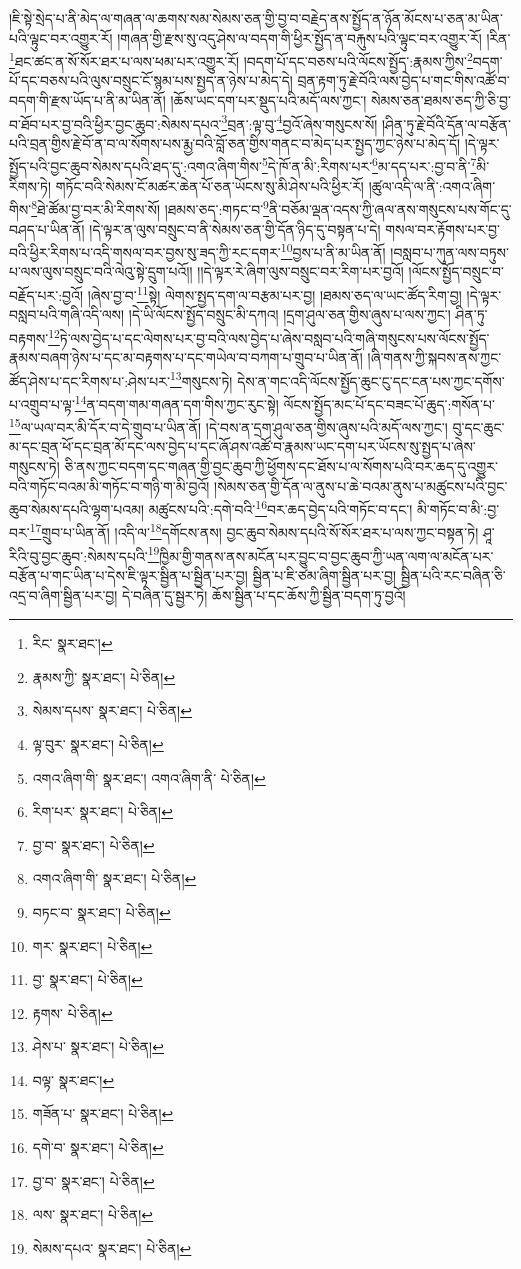 །ཇི་སྟེ་སྲེད་པ་ནི་མེད་ལ་གཞན་ལ་ཆགས་སམ་སེམས་ཅན་གྱི་བྱ་བ་བརྗེད་ནས་སྤྱོད་ན་ཉོན་མོངས་པ་ཅན་མ་ཡིན་པའི་ལྟུང་བར་འགྱུར་རོ། །གཞན་གྱི་རྫས་སུ་འདུ་ཤེས་ལ་བདག་གི་ཕྱིར་སྤྱོད་ན་བརྐུས་པའི་ལྟུང་བར་འགྱུར་རོ། །རིན་\footnote{རིང་  སྣར་ཐང་། }ཐང་ཚང་ན་སོ་སོར་ཐར་པ་ལས་ཕམ་པར་འགྱུར་རོ། །བདག་པོ་དང་བཅས་པའི་ལོངས་སྤྱོད་:རྣམས་ཀྱིས་\footnote{རྣམས་ཀྱི་  སྣར་ཐང་།  པེ་ཅིན། }བདག་པོ་དང་བཅས་པའི་ལུས་བསྲུང་ངོ་སྙམ་པས་སྤྱད་ན་ཉེས་པ་མེད་དེ། བྲན་རྟག་ཏུ་རྗེ་བོའི་ལས་བྱེད་པ་གང་གིས་འཚོ་བ་བདག་གི་རྫས་ཡོད་པ་ནི་མ་ཡིན་ནོ། །ཆོས་ཡང་དག་པར་སྡུད་པའི་མདོ་ལས་ཀྱང་། སེམས་ཅན་ཐམས་ཅད་ཀྱི་ཅི་བྱ་བ་ཐོབ་པར་བྱ་བའི་ཕྱིར་བྱང་ཆུབ་:སེམས་དཔའ་\footnote{སེམས་དཔས་  སྣར་ཐང་།  པེ་ཅིན། }བྲན་:ལྟ་བུ་\footnote{ལྟ་བུར་  སྣར་ཐང་།  པེ་ཅིན། }བྱའོ་ཞེས་གསུངས་སོ། །ཤིན་ཏུ་རྗེ་བོའི་དོན་ལ་བརྩོན་པའི་བྲན་གྱིས་རྗེ་བོ་ན་བ་ལ་སོགས་པས་རྨྱ་བའི་བློ་ཅན་གྱིས་གནང་བ་མེད་པར་སྤྱད་ཀྱང་ཉེས་པ་མེད་དོ། །དེ་ལྟར་སྤྱོད་པའི་བྱང་ཆུབ་སེམས་དཔའི་ཐད་དུ་:འགའ་ཞིག་གིས་\footnote{འགའ་ཞིག་གི་  སྣར་ཐང་། འགའ་ཞིག་ནི་  པེ་ཅིན། }དེ་ཁོ་ན་མི་:རིགས་པར་\footnote{རིག་པར་  སྣར་ཐང་།  པེ་ཅིན། }མ་དད་པར་:བྱ་བ་ནི་\footnote{བྱ་བ་  སྣར་ཐང་།  པེ་ཅིན། }མི་རིགས་ཏེ། གཏོང་བའི་སེམས་ངོ་མཚར་ཆེན་པོ་ཅན་ཡོངས་སུ་མི་ཤེས་པའི་ཕྱིར་རོ། །ཚུལ་འདི་ལ་ནི་:འགའ་ཞིག་གིས་\footnote{འགའ་ཞིག་གི་  སྣར་ཐང་།  པེ་ཅིན། }ཐེ་ཚོམ་བྱ་བར་མི་རིགས་སོ། །ཐམས་ཅད་:གཏང་བ་\footnote{བཏང་བ་  སྣར་ཐང་།  པེ་ཅིན། }ནི་བཅོམ་ལྡན་འདས་ཀྱི་ཞལ་ནས་གསུངས་པས་གོང་དུ་བཤད་པ་ཡིན་ནོ། །དེ་ལྟར་ན་ལུས་བསྲུང་བ་ནི་སེམས་ཅན་གྱི་དོན་ཉིད་དུ་བསྟན་པ་དེ། གསལ་བར་རྟོགས་པར་བྱ་བའི་ཕྱིར་རིགས་པ་འདི་གསལ་བར་བྱས་སུ་ཟད་ཀྱི་རང་དགར་\footnote{གར་  སྣར་ཐང་།  པེ་ཅིན། }བྱས་པ་ནི་མ་ཡིན་ནོ། །བསླབ་པ་ཀུན་ལས་བཏུས་པ་ལས་ལུས་བསྲུང་བའི་ལེའུ་སྟེ་དྲུག་པའོ།། །།དེ་ལྟར་རེ་ཞིག་ལུས་བསྲུང་བར་རིག་པར་བྱའོ། །ལོངས་སྤྱོད་བསྲུང་བ་བརྗོད་པར་:བྱའོ། །ཞེས་བྱ་བ་\footnote{བྱ་  སྣར་ཐང་།  པེ་ཅིན། }སྟེ། ལེགས་སྤྱད་དག་ལ་བརྩམ་པར་བྱ། །ཐམས་ཅད་ལ་ཡང་ཚོད་རིག་བྱ། །དེ་ལྟར་བསླབ་པའི་གཞི་འདི་ལས། །དེ་ཡི་ལོངས་སྤྱོད་བསྲུང་མི་དཀའ། །དྲག་ཤུལ་ཅན་གྱིས་ཞུས་པ་ལས་ཀྱང་། ཤིན་ཏུ་བརྟགས་\footnote{རྟགས་  པེ་ཅིན། }ཏེ་ལས་བྱེད་པ་དང་ལེགས་པར་བྱ་བའི་ལས་བྱེད་པ་ཞེས་བསླབ་པའི་གཞི་གསུངས་པས་ལོངས་སྤྱོད་རྣམས་བཞག་ཉེས་པ་དང་མ་བརྟགས་པ་དང་གཡེལ་བ་བཀག་པ་གྲུབ་པ་ཡིན་ནོ། །ཞི་གནས་ཀྱི་སྐབས་ནས་ཀྱང་ཚོད་ཤེས་པ་དང་རིགས་པ་:ཤེས་པར་\footnote{ཤེས་པ་  སྣར་ཐང་།  པེ་ཅིན། }གསུངས་ཏེ། དེས་ན་གང་འདི་ལོངས་སྤྱོད་ཆུང་ངུ་དང་ངན་པས་ཀྱང་དགོས་པ་འགྲུབ་པ་ལྟ་\footnote{བལྟ་  སྣར་ཐང་། }ན་བདག་གམ་གཞན་དག་གིས་ཀྱང་རུང་སྟེ། ལོངས་སྤྱོད་མང་པོ་དང་བཟང་པོ་ཆུད་:གསོན་པ་\footnote{གཟོན་པ་  སྣར་ཐང་།  པེ་ཅིན། }ལ་ཡལ་བར་མི་དོར་བ་དེ་གྲུབ་པ་ཡིན་ནོ། །དེ་བས་ན་དྲག་ཤུལ་ཅན་གྱིས་ཞུས་པའི་མདོ་ལས་ཀྱང་། བུ་དང་ཆུང་མ་དང་བྲན་ཕོ་དང་བྲན་མོ་དང་ལས་བྱེད་པ་དང་ཞོ་ཤས་འཚོ་བ་རྣམས་ཡང་དག་པར་ཡོངས་སུ་སྤྱད་པ་ཞེས་གསུངས་ཏེ། ཅི་ནས་ཀྱང་བདག་དང་གཞན་གྱི་བྱང་ཆུབ་ཀྱི་ཕྱོགས་དང་ཐོས་པ་ལ་སོགས་པའི་བར་ཆད་དུ་འགྱུར་བའི་གཏོང་བའམ་མི་གཏོང་བ་གཉི་ག་མི་བྱའོ། །སེམས་ཅན་གྱི་དོན་ལ་ནུས་པ་ཆེ་བའམ་ནུས་པ་མཚུངས་པའི་བྱང་ཆུབ་སེམས་དཔའི་ལྷག་པའམ། མཚུངས་པའི་:དགེ་བའི་\footnote{དགེ་བ་  སྣར་ཐང་།  པེ་ཅིན། }བར་ཆད་བྱེད་པའི་གཏོང་བ་དང་། མི་གཏོང་བ་མི་:བྱ་བར་\footnote{བྱ་བ་  སྣར་ཐང་།  པེ་ཅིན། }གྲུབ་པ་ཡིན་ནོ། །འདི་ལ་\footnote{ལས་  སྣར་ཐང་།  པེ་ཅིན། }དགོངས་ནས། བྱང་ཆུབ་སེམས་དཔའི་སོ་སོར་ཐར་པ་ལས་ཀྱང་བསྟན་ཏེ། ཤཱ་རིའི་བུ་བྱང་ཆུབ་:སེམས་དཔའི་\footnote{སེམས་དཔའ་  སྣར་ཐང་།  པེ་ཅིན། }ཁྱིམ་གྱི་གནས་ནས་མངོན་པར་བྱུང་བ་བྱང་ཆུབ་ཀྱི་ཡན་ལག་ལ་མངོན་པར་བརྩོན་པ་གང་ཡིན་པ་དེས་ཇི་ལྟར་སྦྱིན་པ་སྦྱིན་པར་བྱ། སྦྱིན་པ་ཇི་ཙམ་ཞིག་སྦྱིན་པར་བྱ། སྦྱིན་པའི་རང་བཞིན་ཅི་འདྲ་བ་ཞིག་སྦྱིན་པར་བྱ། དེ་བཞིན་དུ་སྦྱར་ཏེ། ཆོས་སྦྱིན་པ་དང་ཆོས་ཀྱི་སྦྱིན་བདག་ཏུ་བྱའོ། 